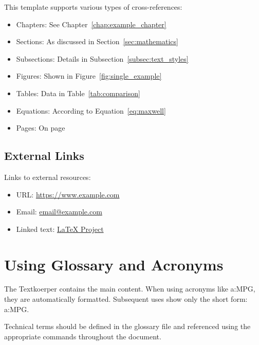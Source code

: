 This template supports various types of cross-references:

\begin{itemize}
	\item Chapters: See Chapter~\ref{chap:example_chapter}
	\item Sections: As discussed in Section~\ref{sec:mathematics}
	\item Subsections: Details in Subsection~\ref{subsec:text_styles}
	\item Figures: Shown in Figure~\ref{fig:single_example}
	\item Tables: Data in Table~\ref{tab:comparison}
	\item Equations: According to Equation~\eqref{eq:maxwell}
	\item Pages: On page~\pageref{sec:lists}
\end{itemize}

\subsection{External Links}
\label{subsec:external_links}

Links to external resources:
\begin{itemize}
	\item URL: \url{https://www.example.com}
	\item Email: \href{mailto:email@example.com}{email@example.com}
	\item Linked text: \href{https://www.latex-project.org}{LaTeX Project}
\end{itemize}

\section{Using Glossary and Acronyms}
\label{sec:glossary_usage}

The \gls{Textkoerper} contains the main content. When using acronyms like
\acrfull{a:MPG}, they are automatically formatted. Subsequent uses show only
the short form: \acrshort{a:MPG}.

Technical terms should be defined in the glossary file and referenced using
the appropriate commands throughout the document.


